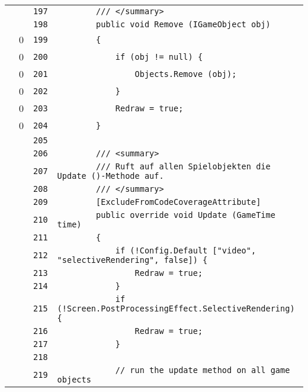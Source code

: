 \documentclass[a4paper,10pt]{article}
\begin{document}
\begin{longtable}[l]{lrrl}
\cellcolor{gray} &  & \verb~197~ & \verb~        /// </summary>~\\
\cellcolor{gray} &  & \verb~198~ & \verb~        public void Remove (IGameObject obj)~\\
\cellcolor{red} & 0 & \verb~199~ & \verb~        {~\\
\cellcolor{red} & 0 & \verb~200~ & \verb~            if (obj != null) {~\\
\cellcolor{red} & 0 & \verb~201~ & \verb~                Objects.Remove (obj);~\\
\cellcolor{red} & 0 & \verb~202~ & \verb~            }~\\
\cellcolor{red} & 0 & \verb~203~ & \verb~            Redraw = true;~\\
\cellcolor{red} & 0 & \verb~204~ & \verb~        }~\\
\cellcolor{gray} &  & \verb~205~ & \verb~~\\
\cellcolor{gray} &  & \verb~206~ & \verb~        /// <summary>~\\
\cellcolor{gray} &  & \verb~207~ & \verb~        /// Ruft auf allen Spielobjekten die Update ()-Methode auf.~\\
\cellcolor{gray} &  & \verb~208~ & \verb~        /// </summary>~\\
\cellcolor{gray} &  & \verb~209~ & \verb~        [ExcludeFromCodeCoverageAttribute]~\\
\cellcolor{gray} &  & \verb~210~ & \verb~        public override void Update (GameTime time)~\\
\cellcolor{gray} &  & \verb~211~ & \verb~        {~\\
\cellcolor{gray} &  & \verb~212~ & \verb~            if (!Config.Default ["video", "selectiveRendering", false]) {~\\
\cellcolor{gray} &  & \verb~213~ & \verb~                Redraw = true;~\\
\cellcolor{gray} &  & \verb~214~ & \verb~            }~\\
\cellcolor{gray} &  & \verb~215~ & \verb~            if (!Screen.PostProcessingEffect.SelectiveRendering) {~\\
\cellcolor{gray} &  & \verb~216~ & \verb~                Redraw = true;~\\
\cellcolor{gray} &  & \verb~217~ & \verb~            }~\\
\cellcolor{gray} &  & \verb~218~ & \verb~~\\
\cellcolor{gray} &  & \verb~219~ & \verb~            // run the update method on all game objects~\\

\end{longtable}
\end{document}
